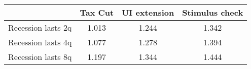 \begin{tabular}{@{}lccc@{}}
\toprule
& Tax Cut    & UI extension    & Stimulus check    \\  \midrule
Recession lasts 2q &1.013  & 1.244  & 1.342     \\
Recession lasts 4q &1.077  & 1.278  & 1.394     \\
Recession lasts 8q &1.197  & 1.344  & 1.444     \\
\end{tabular}
